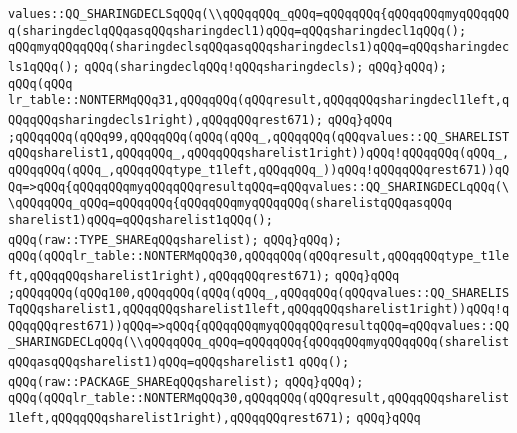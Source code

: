 \verb|values::QQ_SHARINGDECLSqQQq(\\qQQqqQQq_qQQq=qQQqqQQq{qQQqqQQqmyqQQqqQQq(sharingdeclqQQqasqQQqsharingdecl1)qQQq=qQQqsharingdecl1qQQq();|\newline
\verb|qQQqmyqQQqqQQq(sharingdeclsqQQqasqQQqsharingdecls1)qQQq=qQQqsharingdecls1qQQq();|\newline
\verb|qQQq(sharingdeclqQQq!qQQqsharingdecls);|\newline
\verb|qQQq}qQQq);|\newline
\verb|qQQq(qQQq|\newline
\verb|lr_table::NONTERMqQQq31,qQQqqQQq(qQQqresult,qQQqqQQqsharingdecl1left,qQQqqQQqsharingdecls1right),qQQqqQQqrest671);|\newline
\verb|qQQq}qQQq|\newline
\verb|;qQQqqQQq(qQQq99,qQQqqQQq(qQQq(qQQq_,qQQqqQQq(qQQqvalues::QQ_SHARELISTqQQqsharelist1,qQQqqQQq_,qQQqqQQqsharelist1right))qQQq!qQQqqQQq(qQQq_,qQQqqQQq(qQQq_,qQQqqQQqtype_t1left,qQQqqQQq_))qQQq!qQQqqQQqrest671))qQQq=>qQQq{qQQqqQQqmyqQQqqQQqresultqQQq=qQQqvalues::QQ_SHARINGDECLqQQq(\\qQQqqQQq_qQQq=qQQqqQQq{qQQqqQQqmyqQQqqQQq(sharelistqQQqasqQQq|\newline
\verb|sharelist1)qQQq=qQQqsharelist1qQQq();|\newline
\verb|qQQq(raw::TYPE_SHAREqQQqsharelist);|\newline
\verb|qQQq}qQQq);|\newline
\verb|qQQq(qQQqlr_table::NONTERMqQQq30,qQQqqQQq(qQQqresult,qQQqqQQqtype_t1left,qQQqqQQqsharelist1right),qQQqqQQqrest671);|\newline
\verb|qQQq}qQQq|\newline
\verb|;qQQqqQQq(qQQq100,qQQqqQQq(qQQq(qQQq_,qQQqqQQq(qQQqvalues::QQ_SHARELISTqQQqsharelist1,qQQqqQQqsharelist1left,qQQqqQQqsharelist1right))qQQq!qQQqqQQqrest671))qQQq=>qQQq{qQQqqQQqmyqQQqqQQqresultqQQq=qQQqvalues::QQ_SHARINGDECLqQQq(\\qQQqqQQq_qQQq=qQQqqQQq{qQQqqQQqmyqQQqqQQq(sharelistqQQqasqQQqsharelist1)qQQq=qQQqsharelist1|\newline
\verb|qQQq();|\newline
\verb|qQQq(raw::PACKAGE_SHAREqQQqsharelist);|\newline
\verb|qQQq}qQQq);|\newline
\verb|qQQq(qQQqlr_table::NONTERMqQQq30,qQQqqQQq(qQQqresult,qQQqqQQqsharelist1left,qQQqqQQqsharelist1right),qQQqqQQqrest671);|\newline
\verb|qQQq}qQQq|\newline

